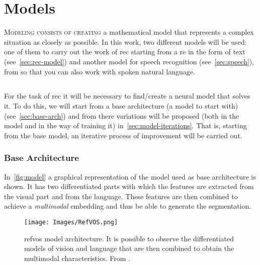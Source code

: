 

\chapter{Models}\label{cha:models}



\lettrine{M}{odeling consists of creating} a mathematical model that represents
a complex situation as closely as possible. In this work, two different models
will be used: one of them to carry out the work of \gls{rec} starting from a
\gls{re} in the form of text (see\ \vref{sec:rec-model}) and another model for
speech recognition (see\ \vref{sec:speech}), from so that you can also work with
spoken natural language.



\section{}\label{sec:rec-model}

For the task of \gls{rec} it will be necessary to find/create a neural model
that solves it. To do this, we will start from a base architecture (a model to
start with) (see\ \vref{sec:base-arch}) and from there variations will be
proposed (both in the model and in the way of training it) in\
\vref{sec:model-iterations}. That is, starting from the base model, an
iterative process of improvement will be carried out.


\subsection{Base Architecture}\label{sec:base-arch}

In\ \vref{fig:model} a graphical representation of the model used as base
architecture is shown. It has two differentiated parts with which the features
are extracted from the visual part and from the language. These features are
then combined to achieve a \emph{multimodal} embedding and thus be able to
generate the segmentation.

\begin{figure}[ht]
  \centering
  \texttt{[image: Images/RefVOS.png]}
  \caption[ model architecture]{\gls{refvos} model
    architecture. It is possible to observe the differentiated models of vision
    and language that are then combined to obtain the multimodal
    characteristics. From \figcite{bellver20:refvos}.}%
  \label{fig:model}
\end{figure}

